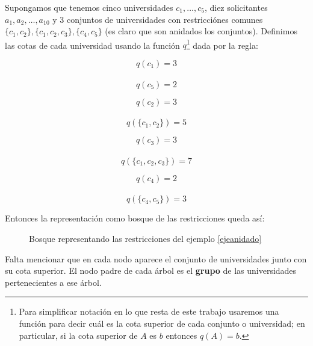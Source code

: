 \begin{eje}\label{ejeanidado}
Supongamos que tenemos cinco universidades $c_1,\dots,c_5$, diez solicitantes $a_1,a_2,\dots,a_{10}$ y 3 conjuntos de universidades con restricciónes comunes $\{c_1,c_2\},\{c_1,c_2,c_3\},\{c_4,c_5\}$ (es claro que son anidados los conjuntos). Definimos las cotas de cada universidad usando la función $q$\footnote{Para simplificar notación en lo que resta de este trabajo usaremos una función para decir cuál es la cota superior de cada conjunto o universidad; en particular, si la cota superior de $A$ es $b$ entonces $q(A)=b$.} dada por la regla:

 \begin{minipage}{.25\linewidth}
$$q(c_1)=3$$ \\
$$q(c_5)=2$$ 
\end{minipage}%
\begin{minipage}{.25\linewidth}
$$q(c_2)=3$$ \\
$$q(\{c_1,c_2\})=5$$ 
\end{minipage}
\begin{minipage}{.25\linewidth}
$$q(c_3)=3$$ \\
$$q(\{c_1,c_2,c_3\})=7$$ 
\end{minipage}
\begin{minipage}{.25\linewidth}
$$q(c_4)=2$$ \\
$$q(\{c_4,c_5\})=3$$ 
\end{minipage}

Entonces la representación como bosque de las restricciones queda así:

\begin{figure}[H]
\noindent \begin{minipage}{.5\linewidth}
\centering
{}
\end{minipage}%
 \begin{minipage}{.5\linewidth}
\centering
{}
\end{minipage}%
\caption{Bosque representando las restricciones del ejemplo \ref{ejeanidado}}
\end{figure}
Falta mencionar que en cada nodo aparece el conjunto de universidades junto con su cota superior. El nodo padre de cada árbol es el \textbf{grupo} de las universidades pertenecientes a ese árbol. \fin
\end{eje}

